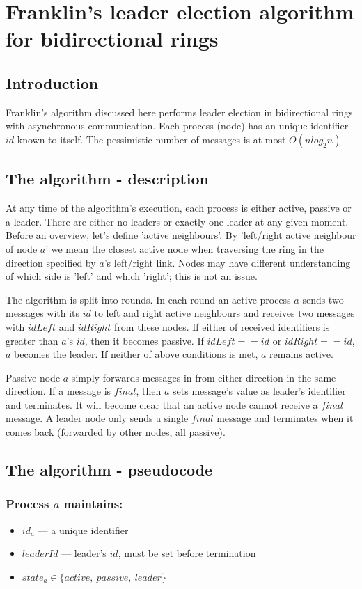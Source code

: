 \documentclass{article}
\begin{document}
\section*{Franklin's leader election algorithm for bidirectional rings}

\subsection*{Introduction}
Franklin's algorithm discussed here performs leader election in bidirectional rings with asynchronous communication. Each process (node) has an unique identifier $id$ known to itself.
The pessimistic number of messages is at most $O(nlog_2 n)$.

\subsection*{The algorithm - description}
At any time of the algorithm's execution, each process is either active, passive or a leader. There are either no leaders or exactly one leader at any given moment. Before an overview, let's define 'active neighbours'. By 'left/right active neighbour of node $a$' we mean the closest active node when traversing the ring in the direction specified by $a$'s left/right link. Nodes may have different understanding of which side is 'left' and which 'right'; this is not an issue. 

The algorithm is split into rounds. In each round an active process $a$ sends two messages with its $id$ to left and right active neighbours and receives two messages with $idLeft$ and $idRight$ from these nodes. If either of received identifiers is greater than $a$'s $id$, then it becomes passive. If $idLeft==id$ or $idRight==id$, $a$ becomes the leader. If neither of above conditions is met, $a$ remains active.

Passive node $a$ simply forwards messages in from either direction in the same direction. If a message is $final$, then $a$ sets message's value as leader's identifier and terminates. It will become clear that an active node cannot receive a $final$ message. A leader node only sends a single $final$ message and terminates when it comes back (forwarded by other nodes, all passive). 

\subsection*{The algorithm - pseudocode}
\subsubsection*{Process $a$ maintains:}
\begin{itemize}
    \item $id_a$ --- a unique identifier
    \item $leaderId$ --- leader's $id$, must be set before termination
    \item $state_a \in \{active,\ passive,\ leader\}$
\end{itemize}
\end{document}
